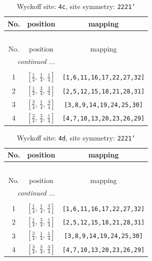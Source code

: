 \documentclass[fleqn,8pt]{jsarticle}
\begin{document}
\renewcommand{\arraystretch}{1.2}
\begin{longtable}{ccc}
\caption{Wyckoff site: {\tt 4c}, site symmetry: {\tt 2221'}}
 \\
 \hline \hline
No. & position & mapping \\ \hline \endfirsthead

\multicolumn{2}{l}{\tablename\ \thetable{}} \\
 \hline \hline
No. & position & mapping \\ \hline \endhead

 \hline \hline
\multicolumn{2}{r}{\footnotesize\it continued ...} \\ \endfoot

 \hline \hline
\multicolumn{2}{r}{} \\ \endlastfoot

1 & $\left[ \frac{1}{4},\, \frac{1}{4},\, \frac{1}{4} \right]$ & {\tt [1,6,11,16,17,22,27,32]} \\ \hline
2 & $\left[ \frac{1}{4},\, \frac{3}{4},\, \frac{3}{4} \right]$ & {\tt [2,5,12,15,18,21,28,31]} \\ \hline
3 & $\left[ \frac{3}{4},\, \frac{1}{4},\, \frac{3}{4} \right]$ & {\tt [3,8,9,14,19,24,25,30]} \\ \hline
4 & $\left[ \frac{3}{4},\, \frac{3}{4},\, \frac{1}{4} \right]$ & {\tt [4,7,10,13,20,23,26,29]} \\
\end{longtable}
\renewcommand{\arraystretch}{1.2}
\begin{longtable}{ccc}
\caption{Wyckoff site: {\tt 4d}, site symmetry: {\tt 2221'}}
 \\
 \hline \hline
No. & position & mapping \\ \hline \endfirsthead

\multicolumn{2}{l}{\tablename\ \thetable{}} \\
 \hline \hline
No. & position & mapping \\ \hline \endhead

 \hline \hline
\multicolumn{2}{r}{\footnotesize\it continued ...} \\ \endfoot

 \hline \hline
\multicolumn{2}{r}{} \\ \endlastfoot

1 & $\left[ \frac{1}{4},\, \frac{1}{4},\, \frac{3}{4} \right]$ & {\tt [1,6,11,16,17,22,27,32]} \\ \hline
2 & $\left[ \frac{1}{4},\, \frac{3}{4},\, \frac{1}{4} \right]$ & {\tt [2,5,12,15,18,21,28,31]} \\ \hline
3 & $\left[ \frac{3}{4},\, \frac{1}{4},\, \frac{1}{4} \right]$ & {\tt [3,8,9,14,19,24,25,30]} \\ \hline
4 & $\left[ \frac{3}{4},\, \frac{3}{4},\, \frac{3}{4} \right]$ & {\tt [4,7,10,13,20,23,26,29]} \\
\end{longtable}
\end{document}
